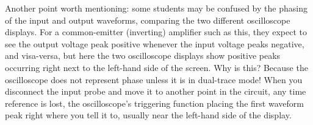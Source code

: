 Another point worth mentioning: some students may be confused by the phasing of the input and output waveforms, comparing the two different oscilloscope displays.  For a common-emitter (inverting) amplifier  such as this, they expect to see the output voltage peak positive whenever the input voltage peaks negative, and visa-versa, but here the two oscilloscope displays show positive peaks occurring right next to the left-hand side of the screen.  Why is this?  Because the oscilloscope does not represent phase unless it is in dual-trace mode!  When you disconnect the input probe and move it to another point in the circuit, any time reference is lost, the oscilloscope's triggering function placing the first waveform peak right where you tell it to, usually near the left-hand side of the display.




